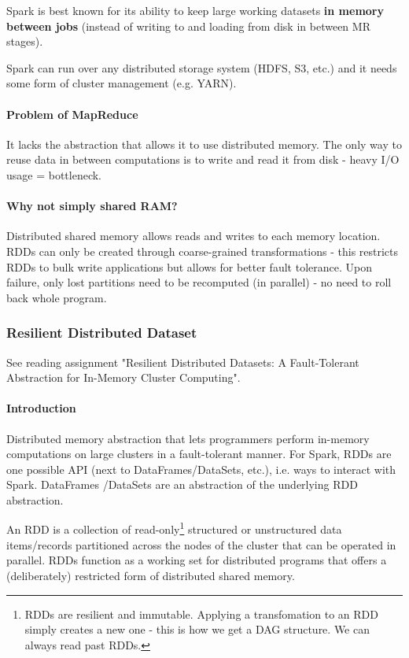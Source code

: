 Spark is best known for its ability to keep large working datasets \textbf{in memory between jobs} (instead of writing to and loading from disk in between MR stages).

Spark can run over any distributed storage system (HDFS, S3, etc.) and it needs some form of cluster management (e.g. YARN).

\paragraph{Problem of MapReduce}
It lacks the abstraction that allows it to use distributed memory. The only way to reuse data in between computations is to write and read it from disk - heavy I/O usage = bottleneck.

\paragraph{Why not simply shared RAM?}
Distributed shared memory allows reads and writes to each memory location. RDDs can only be created through coarse-grained transformations - this restricts RDDs to bulk write applications but allows for better fault tolerance. Upon failure, only lost partitions need to be recomputed (in parallel) - no need to roll back whole program.

\subsubsection{Resilient Distributed Dataset}

See reading assignment "Resilient Distributed Datasets: A Fault-Tolerant Abstraction for In-Memory Cluster Computing".

\paragraph{Introduction}
Distributed memory abstraction that lets programmers perform in-memory computations on large clusters in a fault-tolerant manner. For Spark, RDDs are one possible API (next to DataFrames/DataSets, etc.), i.e. ways to interact with Spark. DataFrames /DataSets are an abstraction of the underlying RDD abstraction.

An RDD is a collection of read-only\footnote{RDDs are resilient and immutable. Applying a transfomation to an RDD simply creates a new one - this is how we get a DAG structure. We can always read past RDDs.} structured or unstructured data items/records partitioned across the nodes of the cluster that can be operated in parallel. RDDs function as a working set for distributed programs that offers a (deliberately) restricted form of distributed shared memory.


